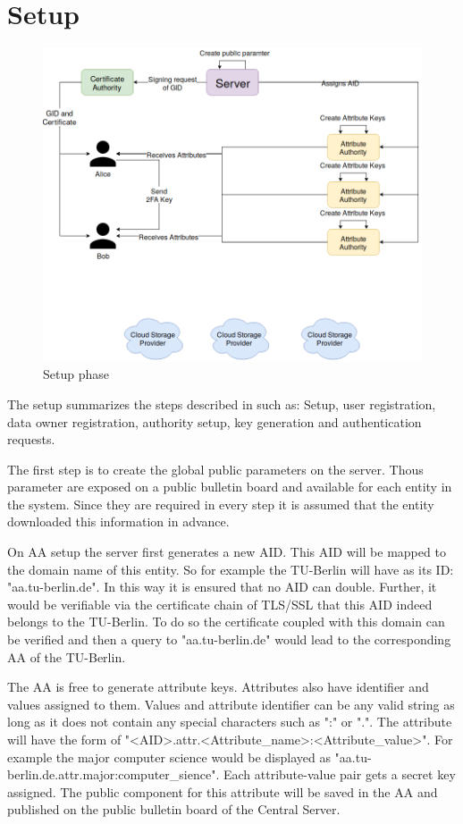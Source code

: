\section{Setup}
\begin{figure}[!ht]
\centering
    \includegraphics[width=\linewidth]{img/TF-DAC-MACS-overview-setup.png}
    \caption{Setup phase}
    \label{fig:tfdacmacs-setup}
\end{figure}

The setup summarizes the steps described in \cite{li2017two} such as: Setup, user registration, data owner registration, authority setup, key generation and authentication requests. 

The first step is to create the global public parameters on the server. Thous parameter are exposed on a public bulletin board and available for each entity in the system. Since they are required in every step it is assumed that the entity downloaded this information in advance. 

On AA setup the server first generates a new AID. This AID will be mapped to the domain name of this entity. So for example the TU-Berlin will have as its ID: "aa.tu-berlin.de". In this way it is ensured that no AID can double. Further, it would be verifiable via the certificate chain of TLS/SSL that this AID indeed belongs to the TU-Berlin. To do so the certificate coupled with this domain can be verified and then a query to "aa.tu-berlin.de" would lead to the corresponding AA of the TU-Berlin.

The AA is free to generate attribute keys. Attributes also have identifier and values assigned to them. Values and attribute identifier can be any valid string as long as it does not contain any special characters such as ":" or ".". The attribute will have the form of "<AID>.attr.<Attribute\_name>:<Attribute\_value>". For example the major computer science would be displayed as "aa.tu-berlin.de.attr.major:computer\_sience". Each attribute-value pair gets a secret key assigned. The public component for this attribute will be saved in the AA and published on the public bulletin board of the Central Server. 


